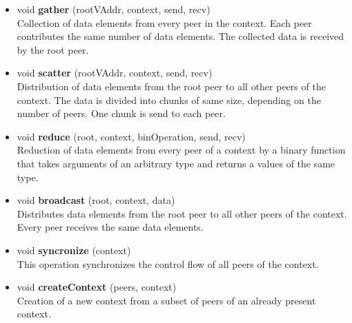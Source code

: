 \begin{itemize}
\item  void \textbf{gather} (rootVAddr, context, send, recv)\\
  Collection of data elements from every peer in the context. Each
  peer contributes the same number of data elements. The collected
  data is received by the root peer.


\item  void \textbf{scatter} (rootVAddr, context, send, recv)\\
  Distribution of data elements from the root peer to all other peers of
  the context. The data is divided into chunks of same
  size, depending on the number of peers. One chunk is send to each peer.


\item  void \textbf{reduce} (root, context, binOperation, send, recv)\\
  Reduction of data elements from every peer of a context
  by a binary function that takes arguments of an arbitrary type
  and returns a values of the same type.


\item  void \textbf{broadcast} (root, context, data)\\
  Distributes data elements from the root peer to all other peers of
  the context. Every peer receives the same data elements.

\item  void \textbf{syncronize} (context)\\
  This operation synchronizes the control flow of all peers of the
  context.

\item  void \textbf{createContext} (peers, context)\\ 
  Creation of a new context from a subset of peers of an already
  present context.

\end{itemize}

